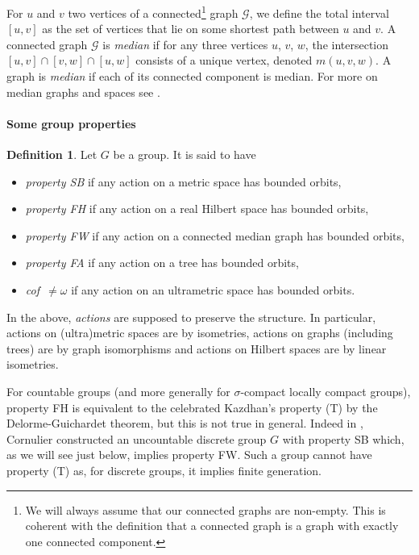 \documentclass[a4paper]{article}
\newcounter{mycomment}
\newcommand{\mycomment}[2][]{\refstepcounter{mycomment}{\todo[color={green!33},size=\small]{\textbf{Commentaire [\uppercase{#1}\themycomment]:}~#2}}}
\newcommand{\PH}[1]{\todo[color={blue!33},size=small]{#1}}
\theoremstyle{definition}
\newtheorem{defn}[lem]{Definition}
\begin{document}
For $u$ and $v$ two vertices of a connected\footnote{We will always assume that our connected graphs are non-empty. This is coherent with the definition that a connected graph is a graph with exactly one connected component.} graph $\mathcal G$, we define the total interval $[u,v]$ as the set of vertices that lie on some shortest path between $u$ and $v$.
A connected graph $\mathcal G$ is \emph{median} if for any three vertices $u$, $v$, $w$, the intersection $[u,v]\cap[v,w]\cap[u,w]$ consists of a unique vertex, denoted $m(u,v,w)$.
A graph is \emph{median} if each of its connected component is median. For more on median graphs and spaces see \cite{MR2405677,MR1705337,MR2671183}.

\paragraph{Some group properties}
%
%
\begin{defn}\label{Def:FHFA}
Let $G$ be a group.
It is said to have
\begin{itemize}
\item\emph{property SB} if any action on a metric space has bounded orbits,
\item \emph{property FH} if any action on a real Hilbert space has bounded orbits,
\item
\emph{property FW} if any action on a connected median graph has bounded orbits,
\item
\emph{property FA} if any action on a tree has bounded orbits,
\item
\emph{cof~$\neq\omega$} if any action on an ultrametric space has bounded orbits.
\end{itemize}
In the above, \emph{actions} are supposed to preserve the structure. In particular, actions on (ultra)metric spaces are by isometries, actions on graphs (including trees) are by graph isomorphisms and actions on Hilbert spaces are by linear isometries.
\end{defn}
%
%
For countable groups (and more generally for $\sigma$-compact locally compact groups), property FH is equivalent to the celebrated Kazdhan's property (T) by the Delorme-Guichardet theorem, but this is not true in general. Indeed in \cite{MR2240370}, Cornulier constructed an uncountable discrete group $G$ with property SB which, as we will see just below, implies property FW. Such a group cannot have property (T) as, for discrete groups, it implies finite generation.
\end{document}
